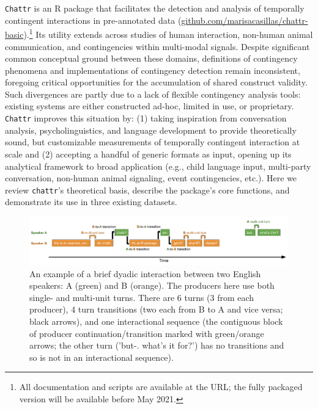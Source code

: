 \documentclass[10pt, letterpaper]{article}
\newenvironment{CodeChunk}{}{}
\begin{document}
\texttt{Chattr} is an R package that facilitates the detection and
analysis of temporally contingent interactions in pre-annotated data
(\href{https://github.com/marisacasillas/chattr-basic}{github.com/marisacasillas/chattr-basic}).\footnote{All
  documentation and scripts are available at the URL; the fully packaged
  version will be available before May 2021.} Its utility extends across
studies of human interaction, non-human animal communication, and
contingencies within multi-modal signals. Despite significant common
conceptual ground between these domains, definitions of contingency
phenomena and implementations of contingency detection remain
inconsistent, foregoing critical opportunities for the accumulation of
shared construct validity. Such divergences are partly due to a lack of
flexible contingency analysis tools: existing systems are either
constructed ad-hoc, limited in use, or proprietary. \texttt{Chattr}
improves this situation by: (1) taking inspiration from conversation
analysis, psycholinguistics, and language development to provide
theoretically sound, but customizable measurements of temporally
contingent interaction at scale and (2) accepting a handful of generic
formats as input, opening up its analytical framework to broad
application (e.g., child language input, multi-party conversation,
non-human animal signaling, event contingencies, etc.). Here we review
\texttt{chattr}'s theoretical basis, describe the package's core
functions, and demonstrate its use in three existing datasets.

\begin{CodeChunk}
\begin{figure}[h]

{\centering \includegraphics{figs/minisequence-1} 

}

\caption[An example of a brief dyadic interaction between two English speakers]{An example of a brief dyadic interaction between two English speakers: A (green) and B (orange). The producers here use both single- and multi-unit turns. There are 6 turns (3 from each producer), 4 turn transitions (two each from B to A and vice versa; black arrows), and one interactional sequence (the contiguous block of producer continuation/transition marked with green/orange arrows; the other turn ('but-. what's it for?') has no transitions and so is not in an interactional sequence).}\label{fig:minisequence}
\end{figure}
\end{CodeChunk}
\end{document}
